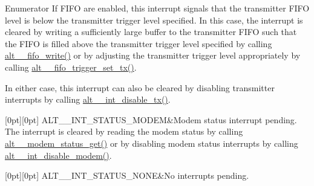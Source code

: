 \begin{DoxyEnumFields}{Enumerator}
If F\+I\+FO are enabled, this interrupt signals that the transmitter F\+I\+FO level is below the transmitter trigger level specified. In this case, the interrupt is cleared by writing a sufficiently large buffer to the transmitter F\+I\+FO such that the F\+I\+FO is filled above the transmitter trigger level specified by calling \mbox{\hyperlink{group__UART__FIFO_ga8d30fc6d9735e51d61c10a5ff86c416e}{alt\+\_\+\_\+fifo\+\_\+write()}} or by adjusting the transmitter trigger level appropriately by calling \mbox{\hyperlink{group__UART__FIFO_ga04495be392cdd03da90dc3480bb50927}{alt\+\_\+\_\+fifo\+\_\+trigger\+\_\+set\+\_\+tx()}}.

In either case, this interrupt can also be cleared by disabling transmitter interrupts by calling \mbox{\hyperlink{group__UART__INT_ga99c55935e7fd74bb8b9723a60de4e843}{alt\+\_\+\_\+int\+\_\+disable\+\_\+tx()}}. \\
\hline

[0pt][0pt]{}\mbox{\label{group__UART__INT_gga108129e1efabc17da3950f0b654c62d0ac1b80d8a9398386d8322e695f41f1ccd}} 
A\+L\+T\+\_\+\_\+\+I\+N\+T\+\_\+\+S\+T\+A\+T\+U\+S\+\_\+\+M\+O\+D\+EM&Modem status interrupt pending. The interrupt is cleared by reading the modem status by calling \mbox{\hyperlink{group__UART__MODEM_gaf74723b502d6c286c04f948ef002d5cd}{alt\+\_\+\_\+modem\+\_\+status\+\_\+get()}} or by disabling modem status interrupts by calling \mbox{\hyperlink{group__UART__INT_ga81cdcdc1193bb885af2b35f3c6917b60}{alt\+\_\+\_\+int\+\_\+disable\+\_\+modem()}}. \\
\hline

[0pt][0pt]{}\mbox{\label{group__UART__INT_gga108129e1efabc17da3950f0b654c62d0a2a38b7cb606028e0f3dcdaaae0f358c6}} 
A\+L\+T\+\_\+\_\+\+I\+N\+T\+\_\+\+S\+T\+A\+T\+U\+S\+\_\+\+N\+O\+NE&No interrupts pending. \\
\hline

\end{DoxyEnumFields}


